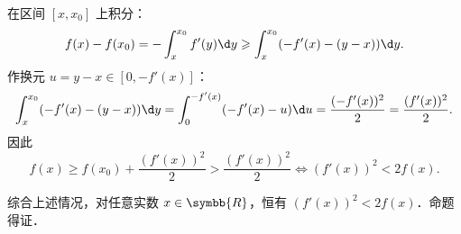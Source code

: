 \begin{myproof}
\begin{enumerate}
              在区间 $[x, x_0]$ 上积分：
              \begin{equation}
                  f(x) - f(x_0) = -\int_x^{x_0} f'(y)\d y \geqslant \int_x^{x_0} (-f'(x) - (y - x))\d y.
              \end{equation}
              作换元 $u = y - x \in [0, -f'(x)]$：
              \begin{equation}
                  \int_x^{x_0} (-f'(x) - (y - x))\d y = \int_0^{-f'(x)} (-f'(x) - u)\d u = \frac{(-f'(x))^2}{2} = \frac{(f'(x))^2}{2}.
              \end{equation}
              因此
              \begin{equation}
                  f(x) \geqslant f(x_0) + \frac{(f'(x))^2}{2} > \frac{(f'(x))^2}{2} \iff (f'(x))^2 < 2f(x).
              \end{equation}
    \end{enumerate}
    综合上述情况，对任意实数 $x \in \symbb{R}$，恒有 $(f'(x))^2 < 2f(x)$．命题得证．
\end{myproof}

\endinput
